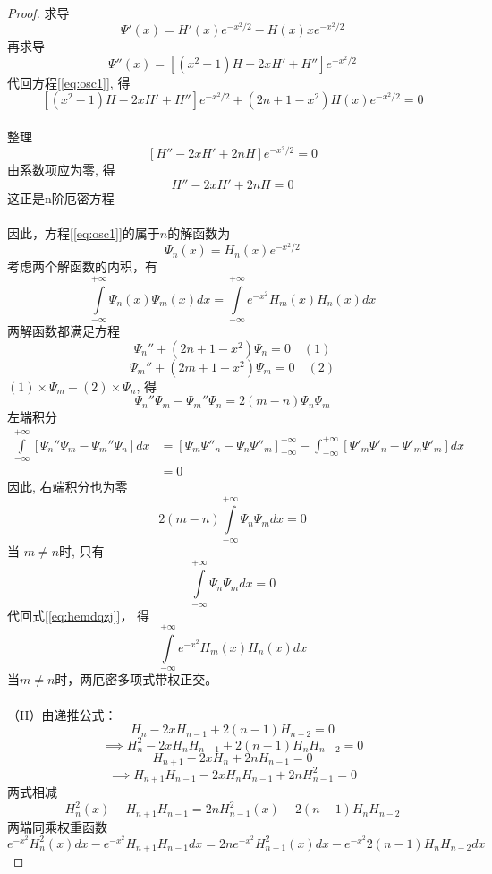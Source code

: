 \begin{proof}
		 求导
		 \begin{equation*}
			 \Psi'(x) = H'(x) e^{-x^2/2 } -  H(x) x e^{-x^2/2 } 
		 \end{equation*} 
		 再求导 
		 \begin{equation*}
			 \Psi''(x) = \left[  \left( x^2 -1 \right) H -2x H' +H''  \right] e^{-x^2/2}
		 \end{equation*}  
		 代回方程[\ref{eq:osc1}], 得 
		 $$ \left[  \left( x^2 -1 \right) H -2x H' +H''  \right] e^{-x^2/2} + \left( 2n+1 - x^2 \right) H(x) e^{-x^2/2 }=0 $$  \\ 
		 整理
		 \[\left[H'' -2 x H' + 2n H \right]e^{-x^2/2 } =0\]
		 由系数项应为零, 得
		 \[H'' -2 x H' +2n H =0\]
		 这正是n阶厄密方程 \\
		 ~\\
		 因此，方程[\ref{eq:osc1}]的属于$n$的解函数为 $$\Psi_n(x)=H_n(x) e^{-x^{2}/2}$$
	考虑两个解函数的内积，有
	\begin{equation}\label{eq:hemdqzj}
		\int\limits_{-\infty}^{+\infty} \Psi_n(x) \Psi_m(x) d x =\int\limits_{-\infty}^{+\infty} e^{-x^{2}} H_m(x) H_n(x)dx
	\end{equation}
	两解函数都满足方程
	$$\Psi _n'' +(2n+1-x^2) \Psi _n =0 \quad (1)$$
	$$\Psi _m'' +(2m+1-x^2) \Psi _m =0 \quad (2)$$
	$(1)\times \Psi _m - (2)\times \Psi _n$, 得
	$$\Psi _n''\Psi _m - \Psi _m''\Psi _n = 2(m-n)\Psi_n \Psi_m $$
	左端积分
	\[ 
	\begin{aligned}
		\int\limits_{-\infty}^{+\infty}  [\Psi _n''\Psi _m - \Psi _m''\Psi _n]dx 
		&= [\Psi_m \Psi''_n -\Psi_n \Psi''_m]_{-\infty} ^{+\infty} - \int_{-\infty} ^{+\infty} [\Psi'_m \Psi'_n -\Psi'_m \Psi'_m] dx \\
		&= 0  
	\end{aligned}
	\]
	因此, 右端积分也为零
	\[2(m-n)\int\limits_{-\infty}^{+\infty} \Psi_n \Psi_m dx =0 \]
	当 $m\ne n$时, 只有 
	\[\int\limits_{-\infty}^{+\infty} \Psi_n \Psi_m dx =0 \]
	代回式[\ref{eq:hemdqzj}]， 得 
	\[\int\limits_{-\infty}^{+\infty} e^{-x^{2}} H_m(x) H_n(x)dx\]
	当$m \ne n$时，两厄密多项式带权正交。\\
    ~\\
	（II）由递推公式：
	$$H_{n} -2xH_{n-1} +2(n-1)H_{n-2} =0  $$ 
	$$ \implies H^2_{n}-2xH_n H_{n-1}+2(n-1) H_n H_{n-2} =0  $$
	$$H_{n+1} -2xH_{n} +2nH_{n-1} =0  $$ 
	$$\implies H_{n+1} H_{n-1}-2xH_{n} H_{n-1}+2nH^2_{n-1} =0  $$ 
	两式相减
	$$H^2 _n(x) -H_{n+1} H_{n-1}=2n H^2 _{n-1}(x) - 2(n-1) H_n H_{n-2}$$	  
	两端同乘权重函数 
	$$ e^{-x^2} H^2 _n(x) dx -  e^{-x^2} H_{n+1} H_{n-1} dx = 2n  e^{-x^{2}} H^2 _{n-1}(x) dx  - e^{-x^{2}} 2(n-1) H_n H_{n-2} dx $$ 	

\end{proof}
